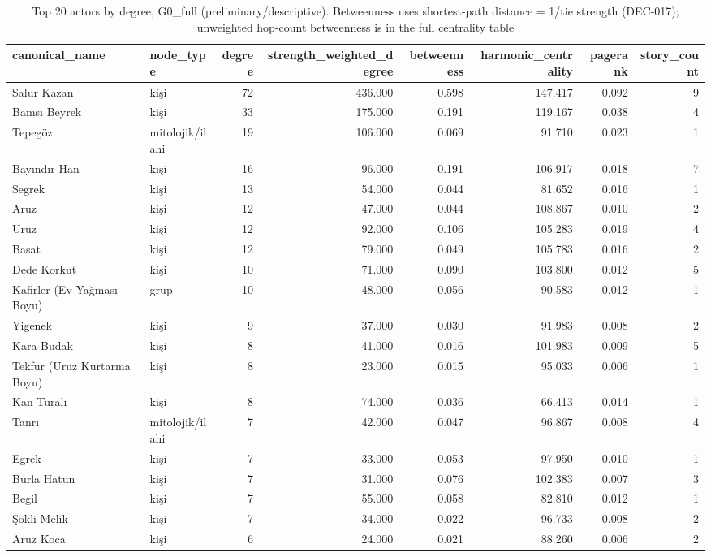 \begin{table}
\caption{Top 20 actors by degree, G0\_full (preliminary/descriptive). Betweenness uses shortest-path distance = 1/tie strength (DEC-017); unweighted hop-count betweenness is in the full centrality table}
\label{tab:t04_centrality_results}
\begin{tabular}{llrrrrrr}
\toprule
canonical_name & node_type & degree & strength_weighted_degree & betweenness & harmonic_centrality & pagerank & story_count \\
\midrule
Salur Kazan & kişi & 72 & 436.000 & 0.598 & 147.417 & 0.092 & 9 \\
Bamsı Beyrek & kişi & 33 & 175.000 & 0.191 & 119.167 & 0.038 & 4 \\
Tepegöz & mitolojik/ilahi & 19 & 106.000 & 0.069 & 91.710 & 0.023 & 1 \\
Bayındır Han & kişi & 16 & 96.000 & 0.191 & 106.917 & 0.018 & 7 \\
Segrek & kişi & 13 & 54.000 & 0.044 & 81.652 & 0.016 & 1 \\
Aruz & kişi & 12 & 47.000 & 0.044 & 108.867 & 0.010 & 2 \\
Uruz & kişi & 12 & 92.000 & 0.106 & 105.283 & 0.019 & 4 \\
Basat & kişi & 12 & 79.000 & 0.049 & 105.783 & 0.016 & 2 \\
Dede Korkut & kişi & 10 & 71.000 & 0.090 & 103.800 & 0.012 & 5 \\
Kafirler (Ev Yağması Boyu) & grup & 10 & 48.000 & 0.056 & 90.583 & 0.012 & 1 \\
Yigenek & kişi & 9 & 37.000 & 0.030 & 91.983 & 0.008 & 2 \\
Kara Budak & kişi & 8 & 41.000 & 0.016 & 101.983 & 0.009 & 5 \\
Tekfur (Uruz Kurtarma Boyu) & kişi & 8 & 23.000 & 0.015 & 95.033 & 0.006 & 1 \\
Kan Turalı & kişi & 8 & 74.000 & 0.036 & 66.413 & 0.014 & 1 \\
Tanrı & mitolojik/ilahi & 7 & 42.000 & 0.047 & 96.867 & 0.008 & 4 \\
Egrek & kişi & 7 & 33.000 & 0.053 & 97.950 & 0.010 & 1 \\
Burla Hatun & kişi & 7 & 31.000 & 0.076 & 102.383 & 0.007 & 3 \\
Begil & kişi & 7 & 55.000 & 0.058 & 82.810 & 0.012 & 1 \\
Şökli Melik & kişi & 7 & 34.000 & 0.022 & 96.733 & 0.008 & 2 \\
Aruz Koca & kişi & 6 & 24.000 & 0.021 & 88.260 & 0.006 & 2 \\
\bottomrule
\end{tabular}
\end{table}
